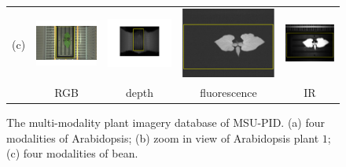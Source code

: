 \begin{figure}
\begin{centering}
\begin{tabular}{@{}c c c c c}
(c) &
\includegraphics[width=.23\textwidth]{Figures/FourModalities/B_rgb}&
\includegraphics[width=.23\textwidth]{Figures/FourModalities/B_depth}&
\includegraphics[width=.23\textwidth]{Figures/FourModalities/B_fmp}&
\includegraphics[width=.23\textwidth]{Figures/FourModalities/B_ir}\\
 & RGB & depth & fluorescence & IR\\
\end{tabular}
\caption{The multi-modality plant imagery database of MSU-PID. (a) four modalities of Arabidopsis; (b) zoom in view of Arabidopsis plant $1$; (c) four modalities of bean.}
\label{fig:fourmodality}
\end{centering}
\end{figure}


